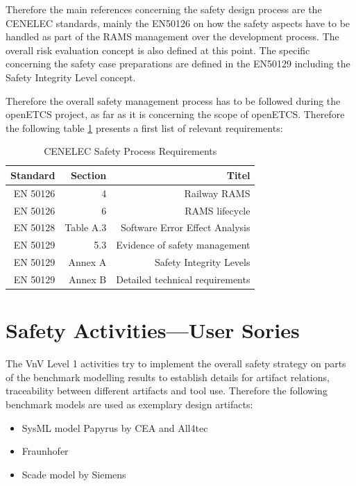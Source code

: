 \documentclass{template/openetcs_report}
\begin{document}
Therefore the main references concerning the safety design process are the CENELEC standards, mainly the EN50126 on how the safety aspects have to be handled as part of the RAMS management over the development process. The overall risk evaluation concept is also defined at this point. The specific concerning the safety case preparations are defined in the EN50129 including the Safety Integrity Level concept. 

Therefore the overall safety management process has to be followed during the openETCS project, as far as it is concerning the scope of openETCS. Therefore the following table \ref{tab:Safety Process Requirements} presents a first list of relevant requirements:

\begin{table}[htbp]
  \centering
  \caption{CENELEC Safety Process Requirements}
    \begin{tabular}{r|r|r}
    Standard & Section & Titel \\
    \hline
     EN 50126 & 4 & Railway RAMS  \\ 
    EN 50126 & 6 & RAMS lifecycle \\
     EN 50128 & Table A.3 & Software Error Effect Analysis\\
    EN 50129 & 5.3 & Evidence of safety management \\
    EN 50129 & Annex A & Safety Integrity Levels \\
    EN 50129 & Annex B & Detailed technical requirements \\
    \end{tabular}%
  \label{tab:Safety Process Requirements}%
\end{table}%

\section{Safety Activities---User Sories}
\label{sec:safety-activ-user}

The VnV Level 1 activities try to implement the overall safety strategy on parts of the benchmark modelling results to establish details for artifact relations, traceability between different artifacts and tool use. Therefore the following benchmark models are used as exemplary design artifacts:

\begin{itemize}
\item SysML model Papyrus by CEA and All4tec

\item Fraunhofer

\item Scade model by Siemens
\end{itemize}
\end{document}
